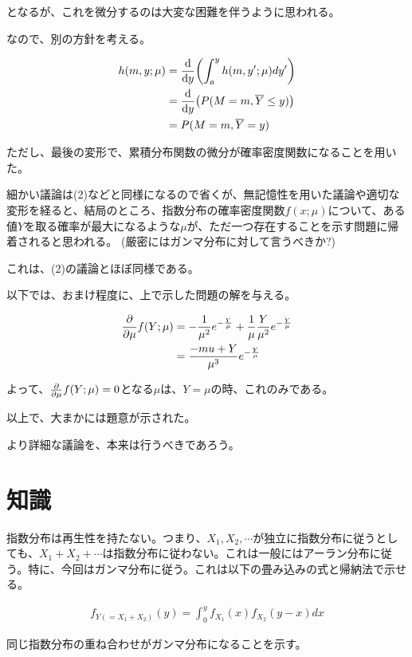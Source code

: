 \documentclass[a4paper, 10pt, dvipdfmx]{jlreq}
\begin{document}
となるが、これを微分するのは大変な困難を伴うように思われる。

なので、別の方針を考える。

\begin{align*}
    h(m,y;\mu) & =\dv{y}\qty(\int_a^y{h(m,y';\mu)}dy')  \\
               & =\dv{y}\qty(P(M=m,\overline{Y}\leq y)) \\
               & =P(M=m,\overline{Y}=y)                 \\
\end{align*}

ただし、最後の変形で、累積分布関数の微分が確率密度関数になることを用いた。

細かい議論は(2)などと同様になるので省くが、無記憶性を用いた議論や適切な変形を経ると、結局のところ、指数分布の確率密度関数$f(x;\mu)$について、ある値$Y$を取る確率が最大になるような$\mu$が、ただ一つ存在することを示す問題に帰着されると思われる。
(厳密にはガンマ分布に対して言うべきか?)

これは、(2)の議論とほぼ同様である。

以下では、おまけ程度に、上で示した問題の解を与える。

\begin{align*}
    \pdv{\mu}f(Y;\mu) & =-\frac{1}{\mu^2}e^{-\frac{Y}{\mu}}+\frac{1}{\mu}\frac{Y}{\mu^2}e^{-\frac{Y}{\mu}} \\
                      & =\frac{-mu+Y}{\mu^3}e^{-\frac{Y}{\mu}}
\end{align*}

よって、$\pdv{\mu}f(Y;\mu)=0$となる$\mu$は、$Y=\mu$の時、これのみである。

以上で、大まかには題意が示された。

より詳細な議論を、本来は行うべきであろう。

\section{知識}

指数分布は再生性を持たない。つまり、$X_1,X_2,\cdots$が独立に指数分布に従うとしても、$X_1+X_2+\cdots$は指数分布に従わない。これは一般にはアーラン分布に従う。特に、今回はガンマ分布に従う。これは以下の畳み込みの式と帰納法で示せる。

\begin{align*}
    f_{Y(=X_1+X_2)}(y)=\int_0^{y}{f_{X_1}(x)f_{X_2}(y-x)dx}
\end{align*}

同じ指数分布の重ね合わせがガンマ分布になることを示す。
\end{document}
